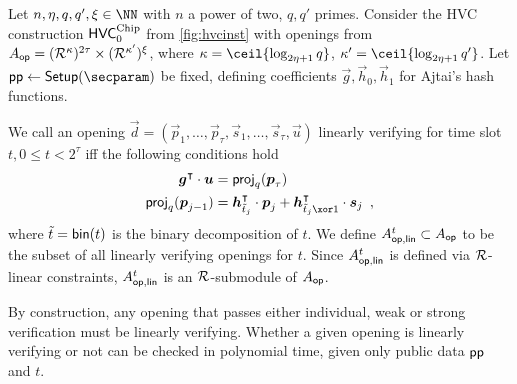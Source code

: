 \begin{definition}\label{def:linearlygoodopenings}
Let $n,\eta, q,q',\xi\in\NN$ with $n$ a power of two, $q,q'$ primes.
Consider the HVC construction $\mathsf{HVC}^{\textup{Chip}}_{0}$ from \autoref{fig:hvcinst} with openings from
$A_{\mathsf{op}} = (\mathcal{R}^\kappa)^{2\tau} \times (\mathcal{R}^{\kappa'})^\xi$, where $\limbs = \ceil{\log_{2\eta+1}q}$, $\limbs' = \ceil{\log_{2\eta+1}q'}$.
Let $\params\gets\setup(\secparam)$ be fixed, defining coefficients $\vec{g},\vec{h}_0,\vec{h}_1$ for Ajtai's hash functions.

We call an opening $\vec{d} = (\vec{p}_1,\ldots,\vec{p}_\tau, \vec{s}_1,\ldots,\vec{s}_\tau,\vec{u})$ linearly verifying for time slot $t, 0\leq t<2^\tau$ iff the following conditions hold
\begin{align*}
\vec{g}^\transpose \cdot \vec{u} & =  \projmod{q}(\vec{p}_\tau)\\
\projmod{q}(\vec{p}_{j-1}) & = \vec{h}_{\tilde t_j}^\transpose\cdot \vec{p}_{j} + \vec{h}_{\tilde t_j \xor 1}^\transpose \cdot \vec{s}_{j}\enspace,
\end{align*}
where $\tilde{t} = \mathsf{bin}(t)$ is the binary decomposition of $t$. We define $A_{\mathsf{op,lin}}^{t}\subset A_{\mathsf{op}}$ to be the subset of all linearly verifying openings for $t$.
Since $A_{\mathsf{op,lin}}^{t}$ is defined via $\mathcal{R}$-linear constraints, $A_{\mathsf{op,lin}}^{t}$ is an $\mathcal{R}$-submodule of $A_{\mathsf{op}}$.
\end{definition}
By construction, any opening that passes either individual, weak or strong verification must be linearly verifying.
Whether a given opening is linearly verifying or not can be checked in polynomial time, given only public data $\mathsf{pp}$ and $t$.

